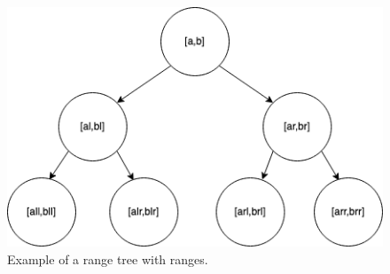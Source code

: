 \begin{figure}[ht]
    \centering
    \includegraphics[width=.8\textwidth]{fig/range-tree-ex.png}
    \caption{Example of a range tree with ranges. }
    \label{fig:range-tree-ex}
\end{figure}